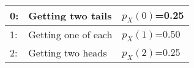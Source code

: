 \begin{tabular}{|l|l|l|}\hline
0:	&Getting two tails& $p_X(0)$=0.25\\\hline
1:	&Getting one of each& $p_X(1)$=0.50\\\hline
2:	&Getting two heads& $p_X(2)$=0.25\\\hline
\end{tabular}
